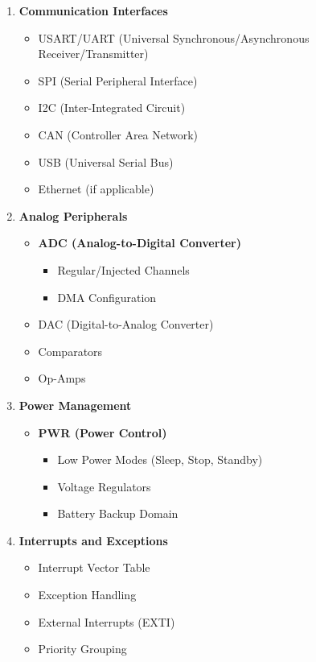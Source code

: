 \documentclass{article}
\begin{document}
\begin{enumerate}[label=\textbf{\arabic*.}]
    \item \textbf{Communication Interfaces}
    \begin{itemize}
        \item USART/UART (Universal Synchronous/Asynchronous Receiver/Transmitter)
        \item SPI (Serial Peripheral Interface)
        \item I2C (Inter-Integrated Circuit)
        \item CAN (Controller Area Network)
        \item USB (Universal Serial Bus)
        \item Ethernet (if applicable)
    \end{itemize}
    
    \item \textbf{Analog Peripherals}
    \begin{itemize}
        \item \textbf{ADC (Analog-to-Digital Converter)}
        \begin{itemize}
            \item Regular/Injected Channels
            \item DMA Configuration
        \end{itemize}
        \item DAC (Digital-to-Analog Converter)
        \item Comparators
        \item Op-Amps
    \end{itemize}
    
    \item \textbf{Power Management}
    \begin{itemize}
        \item \textbf{PWR (Power Control)}
        \begin{itemize}
            \item Low Power Modes (Sleep, Stop, Standby)
            \item Voltage Regulators
            \item Battery Backup Domain
        \end{itemize}
    \end{itemize}
    
    \item \textbf{Interrupts and Exceptions}
    \begin{itemize}
        \item Interrupt Vector Table
        \item Exception Handling
        \item External Interrupts (EXTI)
        \item Priority Grouping
    \end{itemize}
    

\end{enumerate}
\end{document}
